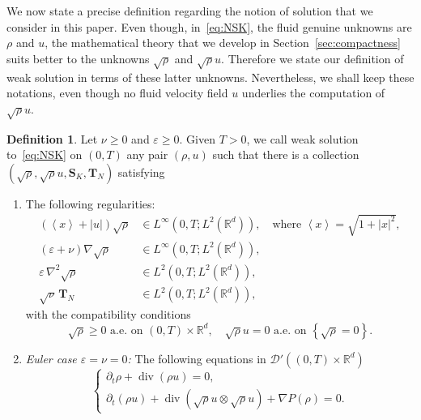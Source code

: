 \documentclass[10pt]{amsart}
\theoremstyle{definition}\newtheorem{defi}[theo]{Definition}\newtheorem{rema}[theo]{Remark}\newtheorem{exam}[theo]{Example}\newtheorem{exem}[theo]{Example}\newtheorem{nota}[theo]{Notation}
\DeclareMathOperator{\DIV}{div}
\newcommand*\R{\mathbb{R}}
\newcommand*\<{\left\langle}
\renewcommand*\>{\right\rangle}
\renewcommand*\ge{\geqslant}
\newcommand*\eps{\varepsilon}
\begin{document}
We now state a precise definition regarding the notion of solution that we consider in this paper. Even though, in~\eqref{eq:NSK}, the fluid genuine unknowns are $\rho$ and $u$, the mathematical theory that we develop in Section~\ref{sec:compactness} suits better to the unknowns $\sqrt{\rho}$ and $\sqrt{\rho}u$. Therefore we state our definition of weak solution in terms of these latter unknowns. Nevertheless, we shall keep these notations, even though no fluid velocity field $u$ underlies the computation of $\sqrt{\rho}u.$

\begin{defi}\label{def:weaksol-minus}
Let $\nu \ge 0$ and $\varepsilon \ge 0.$ Given $T >0$, we call weak solution to~\eqref{eq:NSK} on $(0,T)$ any pair $(\rho,u)$ such that there is a collection $(\sqrt{\rho},\sqrt{\rho}u,\mathbf S_{K},\mathbf T_{N})$ satisfying
\begin{enumerate}
\item \label{2.1.1} The following regularities:
\begin{align*}
\left(\<x\> +|u|\right)\sqrt{\rho} &\in L^{\infty}\left(0,T; L^2 (\R^d)\right),\quad \text{where }\<x\> =\sqrt{1+|x|^2}, \\
(\eps+\nu)\nabla \sqrt \rho &\in L^{\infty}\left(0,T; L^2 (\R^d)\right),\\
\varepsilon \, \nabla^2 \sqrt{\rho} &\in L^2(0,T;L^2(\mathbb R^d)),\\
\sqrt \nu \, \mathbf T_N &\in L^2(0,T; L^2(\mathbb R^d)),
\end{align*}
with the compatibility conditions
\[
\sqrt{\rho} \ge 0 \text{ a.e. on } (0,T)\times \R^d, \quad \sqrt{\rho}u= 0 \text{ a.e. on } \left\{\sqrt{\rho} = 0\right\}.
\]

\item \label{2.1.2} \emph{Euler case $\eps=\nu=0$:} The following equations in $\mathcal D'((0,T)\times \mathbb R^d)$
\begin{equation}\label{eq:NSKminus-bis-euler}
\begin{cases}
\partial_t{\rho}+\DIV ({\rho} u)= 0,\\
\partial_t ({\rho}u) +\DIV (\sqrt{\rho}u \otimes \sqrt{\rho}u) + \nabla P(\rho) =0.
\end{cases}
\end{equation}


\end{enumerate}
\end{defi}
\end{document}
